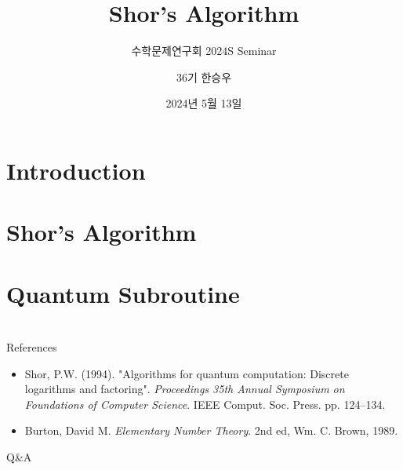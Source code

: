 \documentclass[handout]{beamer}
\title{Shor's Algorithm}
\subtitle{수학문제연구회 2024S Seminar}
\author{36기 한승우}
\institute{KAIST 수학문제연구회}
\date{2024년 5월 13일}
\newcommand{\ii}{\item}
\renewcommand{\:}{\text{ }}
\begin{document}
\begin{frame}
    \titlepage
\end{frame}

\section*{Introduction}


\section{Shor's Algorithm}


\section{Quantum Subroutine}


\section*{\mbox{}}
\begin{frame}{References}
    \begin{itemize}
        \ii Shor, P.W. (1994). "Algorithms for quantum computation: Discrete logarithms and factoring".
        \textit{Proceedings 35th Annual Symposium on Foundations of Computer Science}. IEEE Comput. Soc. Press. pp. 124–134.
        \ii Burton, David M. \textit{Elementary Number Theory}. 2nd ed, Wm. C. Brown, 1989.
    \end{itemize}
\end{frame}
\begin{frame}{Q\&A}
    \begin{center}
    \end{center}
\end{frame}
\end{document}
